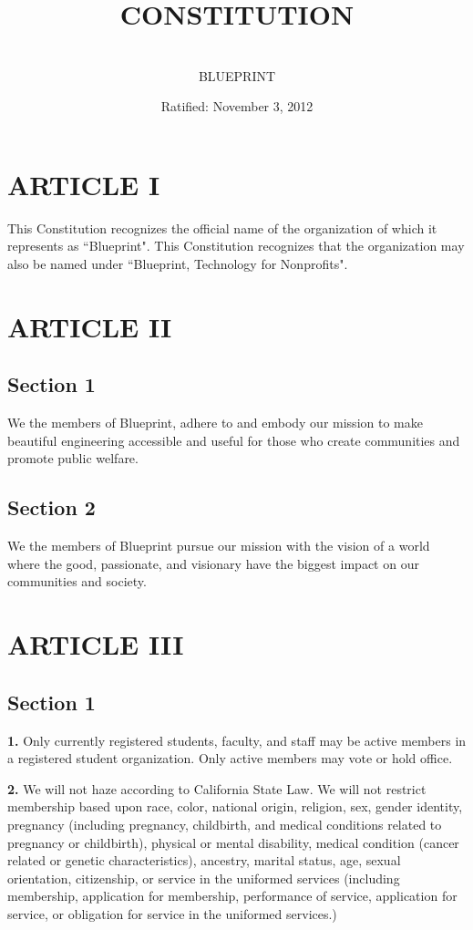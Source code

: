 \documentclass{article}
\title{CONSTITUTION}
\author{\\ \sc BLUEPRINT}
\date{Ratified: November 3, 2012 }
\begin{document}
\maketitle

\section{ARTICLE I}
This Constitution recognizes the official name of the organization of which it represents as ``Blueprint". This Constitution recognizes that the organization may also be named under ``Blueprint, Technology for Nonprofits".

\section{ARTICLE II}
\subsection{Section 1}
We the members of Blueprint, adhere to and embody our mission to make beautiful engineering accessible and useful for those who create communities and promote public welfare.

\subsection{Section 2}
We the members of Blueprint pursue our mission with the vision of a world where the good, passionate, and visionary have the biggest impact on our communities and society.

\section{ARTICLE III}
\subsection{Section 1}

\textbf{1.} Only currently registered students, faculty, and staff may be active members in a registered student organization. Only active members may vote or hold office.

\textbf{2.} We will not haze according to California State Law. We will not restrict membership based upon race, color, national origin, religion, sex, gender identity, pregnancy (including pregnancy, childbirth, and medical conditions related to pregnancy or childbirth), physical or mental disability, medical condition (cancer related or genetic characteristics), ancestry, marital status, age, sexual orientation, citizenship, or service in the uniformed services (including membership, application for membership, performance of service, application for service, or obligation for service in the uniformed services.)
\end{document}
